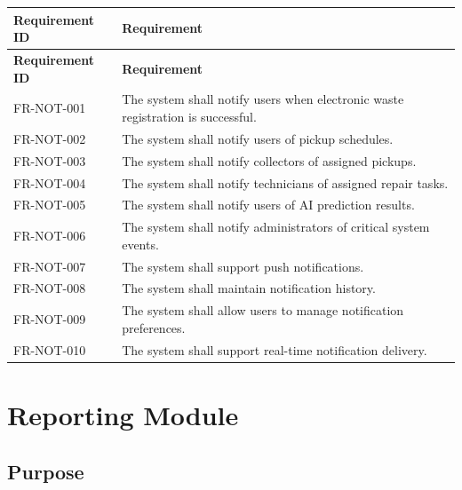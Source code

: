 \begin{longtable}{|p{3cm}|p{10.2cm}|}

\hline
\textbf{Requirement ID} &
\textbf{Requirement} \\
\hline
\endfirsthead

\hline
\textbf{Requirement ID} &
\textbf{Requirement} \\
\hline
\endhead

FR-NOT-001 &
The system shall notify users when electronic waste registration is successful.\\
\hline

FR-NOT-002 &
The system shall notify users of pickup schedules.\\
\hline

FR-NOT-003 &
The system shall notify collectors of assigned pickups.\\
\hline

FR-NOT-004 &
The system shall notify technicians of assigned repair tasks.\\
\hline

FR-NOT-005 &
The system shall notify users of AI prediction results.\\
\hline

FR-NOT-006 &
The system shall notify administrators of critical system events.\\
\hline

FR-NOT-007 &
The system shall support push notifications.\\
\hline

FR-NOT-008 &
The system shall maintain notification history.\\
\hline

FR-NOT-009 &
The system shall allow users to manage notification preferences.\\
\hline

FR-NOT-010 &
The system shall support real-time notification delivery.\\
\hline

\end{longtable}

\section{Reporting Module}
\label{sec:reporting}

\subsection{Purpose}

